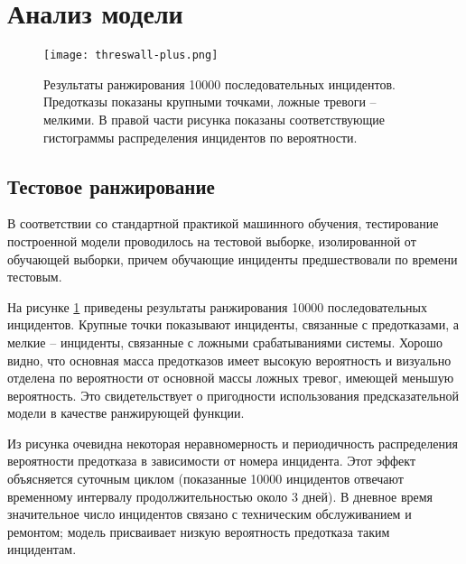 

\section{Анализ модели}

\begin{figure}[thpb] 
\centering
\texttt{[image: threswall-plus.png]}
\caption{Результаты ранжирования 10000 последовательных инцидентов.  Предотказы показаны крупными точками, ложные тревоги -- мелкими. В правой части рисунка показаны соответствующие гистограммы распределения инцидентов по вероятности.}
\centering
\label{fig:histo}
\end{figure}


\subsection{Тестовое ранжирование}

В соответствии со стандартной практикой машинного обучения, тестирование построенной модели проводилось на тестовой выборке, изолированной от обучающей выборки, причем обучающие инциденты предшествовали по времени тестовым. 

На рисунке \ref{fig:histo} приведены результаты ранжирования 10000 последовательных инцидентов. Крупные точки показывают инциденты, связанные с предотказами, а мелкие -- инциденты, связанные с ложными срабатываниями системы. Хорошо видно, что основная масса предотказов имеет высокую вероятность и визуально отделена по вероятности от основной массы ложных тревог, имеющей меньшую вероятность. Это свидетельствует о пригодности использования предсказательной модели в качестве ранжирующей функции.

Из рисунка очевидна некоторая неравномерность и периодичность распределения вероятности предотказа в зависимости от номера инцидента. Этот эффект объясняется суточным циклом (показанные 10000 инцидентов отвечают временному интервалу продолжительностью около 3 дней). В дневное время значительное число инцидентов связано с техническим обслуживанием и ремонтом; модель присваивает низкую вероятность предотказа таким инцидентам.


